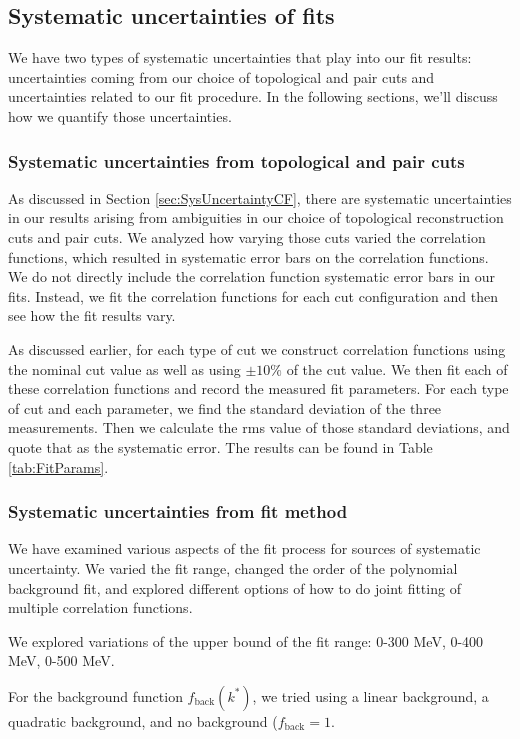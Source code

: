 \subsection{Systematic uncertainties of fits}
\label{sec:SysErrorsFits}

We have two types of systematic uncertainties that play into our fit results: uncertainties coming from our choice of topological and pair cuts and uncertainties related to our fit procedure.
In the following sections, we'll discuss how we quantify those uncertainties.


\subsubsection{Systematic uncertainties from topological and pair cuts}
\label{sec:SysErrorsFitsCuts}

As discussed in Section \ref{sec:SysUncertaintyCF}, there are systematic uncertainties in our results arising from ambiguities in our choice of topological reconstruction cuts and pair cuts.
We analyzed how varying those cuts varied the correlation functions, which resulted in systematic error bars on the correlation functions.
We do not directly include the correlation function systematic error bars in our fits.
Instead, we fit the correlation functions for each cut configuration and then see how the fit results vary.

As discussed earlier, for each type of cut we construct correlation functions using the nominal cut value as well as using $\pm10\%$ of the cut value.
We then fit each of these correlation functions and record the measured fit parameters.
For each type of cut and each parameter, we find the standard deviation of the three measurements.
Then we calculate the rms value of those standard deviations, and quote that as the systematic error.
The results can be found in Table \ref{tab:FitParams}.



\subsubsection{Systematic uncertainties from fit method}
\label{sec:SysErrorsFitsMethod}



We have examined various aspects of the fit process for sources of systematic uncertainty.
We varied the fit range, changed the order of the polynomial background fit, and explored different options of how to do joint fitting of multiple correlation functions.


We explored variations of the upper bound of the fit range: 0-300 MeV, 0-400 MeV, 0-500 MeV.

For the background function $f_{\mathrm{back}}(k^*)$, we tried using a linear background, a quadratic background, and no background ($f_\mathrm{back} = 1$.



